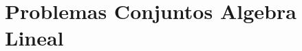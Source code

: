 \documentclass{article}
\begin{document}
\begin{enumerate}

\end{enumerate}

\section{Problemas Conjuntos Algebra Lineal}
\end{document}
